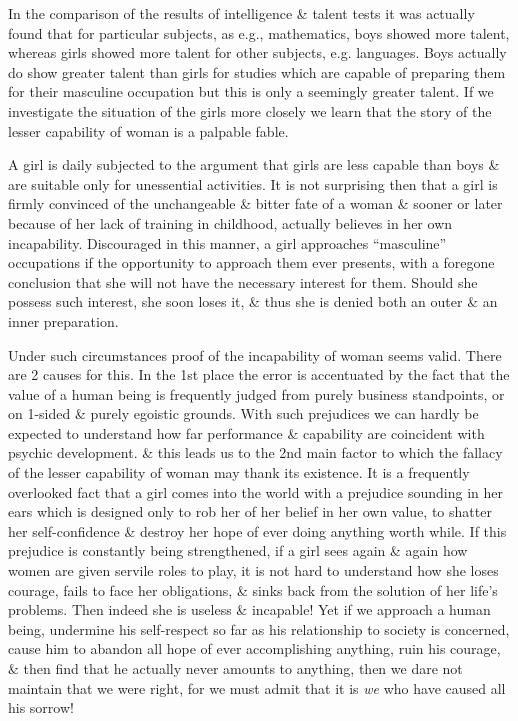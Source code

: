 \documentclass{article}
\begin{document}
In the comparison of the results of intelligence \& talent tests it was actually found that for particular subjects, as e.g., mathematics, boys showed more talent, whereas girls showed more talent for other subjects, e.g. languages. Boys actually do show greater talent than girls for studies which are capable of preparing them for their masculine occupation but this is only a seemingly greater talent. If we investigate the situation of the girls more closely we learn that the story of the lesser capability of woman is a palpable fable.

A girl is daily subjected to the argument that girls are less capable than boys \& are suitable only for unessential activities. It is not surprising then that a girl is firmly convinced of the unchangeable \& bitter fate of a woman \& sooner or later because of her lack of training in childhood, actually believes in her own incapability. Discouraged in this manner, a girl approaches ``masculine'' occupations if the opportunity to approach them ever presents, with a foregone conclusion that she will not have the necessary interest for them. Should she possess such interest, she soon loses it, \& thus she is denied both an outer \& an inner preparation.

Under such circumstances proof of the incapability of woman seems valid. There are 2 causes for this. In the 1st place the error is accentuated by the fact that the value of a human being is frequently judged from purely business standpoints, or on 1-sided \& purely egoistic grounds. With such prejudices we can hardly be expected to understand how far performance \& capability are coincident with psychic development. \& this leads us to the 2nd main factor to which the fallacy of the lesser capability of woman may thank its existence. It is a frequently overlooked fact that a girl comes into the world with a prejudice sounding in her ears which is designed only to rob her of her belief in her own value, to shatter her self-confidence \& destroy her hope of ever doing anything worth while. If this prejudice is constantly being strengthened, if a girl sees again \& again how women are given servile roles to play, it is not hard to understand how she loses courage, fails to face her obligations, \& sinks back from the solution of her life's problems. Then indeed she is useless \& incapable! Yet if we approach a human being, undermine his self-respect so far as his relationship to society is concerned, cause him to abandon all hope of ever accomplishing anything, ruin his courage, \& then find that he actually never amounts to anything, then we dare not maintain that we were right, for we must admit that it is {\it we} who have caused all his sorrow!
\end{document}
